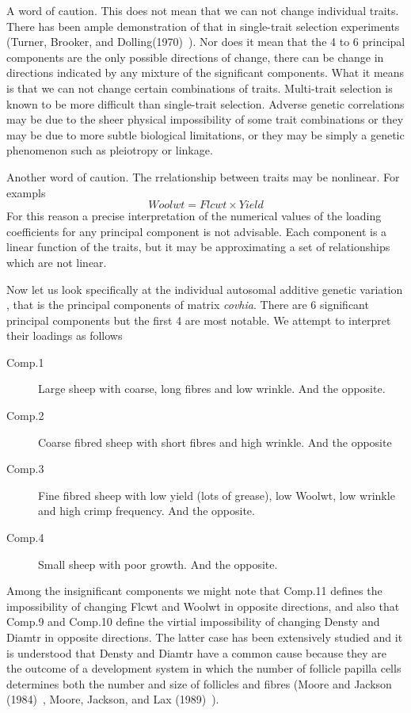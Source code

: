 \documentclass[titlepage]{article}  %
\begin{document}
A word of caution. This does not mean that we can not change individual traits. There has been ample demonstration of that in single-trait selection experiments (Turner, Brooker, and Dolling(1970)~\cite{turn:70}). Nor does it mean that the 4 to 6 principal components are the only possible directions of change, there can be change in directions indicated by any mixture of the significant components. What it means is that we can not change certain combinations of traits. Multi-trait selection is known to be more difficult than single-trait selection. Adverse genetic correlations may be due to the sheer physical impossibility of some trait combinations or they may be due to more subtle biological limitations, or they may be simply a genetic phenomenon such as pleiotropy or linkage. 

Another word of caution. The rrelationship between traits may be nonlinear. For exampls
\begin{displaymath}
Woolwt = Flcwt \times Yield
\end{displaymath}
For this reason a precise interpretation of the numerical values of the loading coefficients for any principal component is not advisable. Each component is a linear function of the traits, but it may be approximating a set of relationships which are not linear.

Now let us look specifically at the individual autosomal additive genetic variation , that is the principal components of matrix {\em covhia}.  There are 6 significant principal components but the first 4 are most notable. We attempt to interpret their loadings as follows

\begin{description}
\item[Comp.1] Large sheep with coarse, long fibres and low wrinkle. And the opposite.
\item[Comp.2] Coarse fibred sheep with short fibres and high wrinkle. And the opposite
\item[Comp.3] Fine fibred sheep with low yield (lots of grease), low Woolwt, low wrinkle and high crimp frequency. And the opposite.
\item[Comp.4] Small sheep with poor growth. And the opposite.
\end{description}

Among the insignificant components we might note that Comp.11 defines the impossibility of changing Flcwt and Woolwt in opposite directions, and also that Comp.9 and Comp.10 define the virtial impossibility of changing Densty and Diamtr in opposite directions. The latter case has been extensively studied and it is understood that Densty and Diamtr have a common cause because they are the outcome of a development system in which the number of follicle papilla cells determines both the number and size of follicles and fibres (Moore  and Jackson (1984)~\cite{moor:84a}, Moore, Jackson, and Lax (1989)~\cite{moor:89}).
\end{document}
